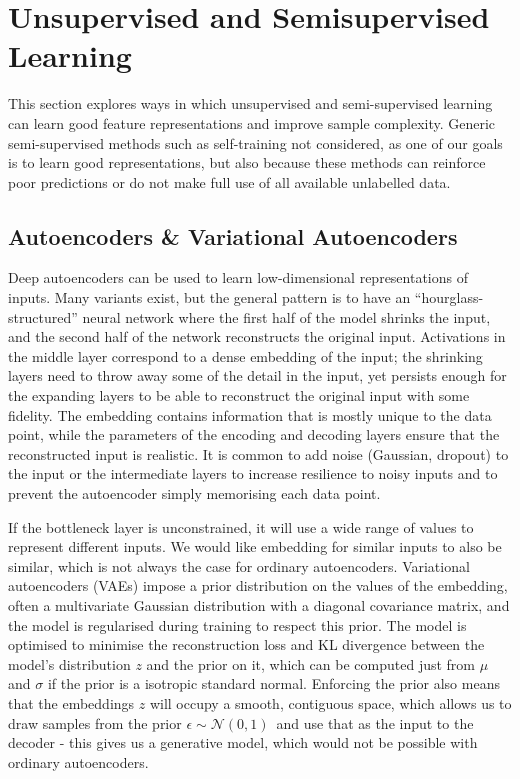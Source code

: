 \section{Unsupervised and Semisupervised Learning}
\label{unsup}

This section explores ways in which unsupervised and semi-supervised learning can learn good feature representations and improve sample complexity. Generic semi-supervised methods such as self-training not considered, as one of our goals is to learn good representations, but also because these methods can reinforce poor predictions or do not make full use of all available unlabelled data.

\subsection{Autoencoders \& Variational Autoencoders}

Deep autoencoders can be used to learn low-dimensional representations of inputs.
Many variants exist,  but  the general pattern is to have an ``hourglass-structured'' neural network where the first half of the model shrinks the input, and the second half of the network reconstructs the original input.
Activations in the middle layer correspond to a dense embedding of the input;  the shrinking layers need to  throw away some of the detail in the input, yet persists enough for the expanding layers to be able to reconstruct the original input with some fidelity.
The embedding contains information that is mostly unique to the data point, while the parameters of the encoding and decoding layers ensure that the reconstructed input is realistic.
It is common to add noise (Gaussian, dropout) to the input or the intermediate layers to increase resilience to noisy inputs and to prevent the autoencoder simply memorising each data point.

If the bottleneck layer is unconstrained, it will use a wide range of values to represent different inputs.
We would like embedding for similar inputs to also be similar, which is not always the case for ordinary autoencoders.
Variational autoencoders (VAEs) impose a prior distribution on the values of the embedding, often a multivariate Gaussian distribution with a diagonal covariance matrix, and the model is regularised during training to respect this prior.
The model is optimised to minimise the reconstruction loss and KL divergence between the model's distribution $z$ and the prior on it, which can be computed just from $\mu$ and $\sigma$ if the prior is a isotropic standard normal.
Enforcing the prior also means that the embeddings $z$ will occupy a smooth, contiguous space, which allows us to draw samples from the prior $\epsilon \sim \mathcal{N}(0, 1)\,$ and use that as the input to the decoder - this gives us a generative model, which would not be possible with ordinary autoencoders.

